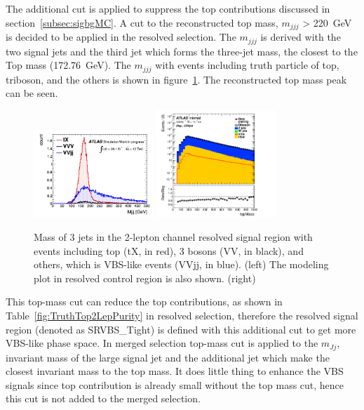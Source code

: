 The additional cut is applied to suppress the top contributions discussed in section~\ref{subsec:sigbgMC}. A cut to the reconstructed top mass, $m_{jjj}$ > 220~GeV is decided to be applied in the resolved selection. The $m_{jjj}$ is derived with the two signal jets and the third jet which forms the three-jet mass, the closest to the Top mass (172.76~GeV). The $m_{jjj}$ with events including truth particle of top, triboson, and the others is shown in figure~\ref{fig:2leptopMass}. The reconstructed top mass peak can be seen.
\begin{figure}[H]
    \begin{center}
      \includegraphics[width=0.4\textwidth]{figures/2lep/topMass/WZjjtopMasspeak}
      \includegraphics[width=0.4\textwidth]{figures/2lep/dataMC/C_0ptag2pjet_0ptv_CRVjet_topMass_Log}
        \caption{ Mass of 3 jets in the 2-lepton channel resolved signal region with events including top (tX, in red), 3 bosons (VV, in black), and others, which is VBS-like events (VVjj, in blue). (left) The modeling plot in resolved control region is also shown. (right)}
        \label{fig:2leptopMass}
    \end{center}
\end{figure}
This top-mass cut can reduce the top contributions, as shown in Table~\ref{fig:TruthTop2LepPurity} in resolved selection, therefore the resolved signal region (denoted as SRVBS\_Tight) is defined with this additional cut to get more VBS-like phase space. In merged selection top-mass cut is applied to the $m_{Jj}$, invariant mass of the large signal jet and the additional jet which make the closest invariant mass to the top mass. It does little thing to enhance the VBS signals since top contribution is already small without the top mass cut, hence this cut is not added to the merged selection.
